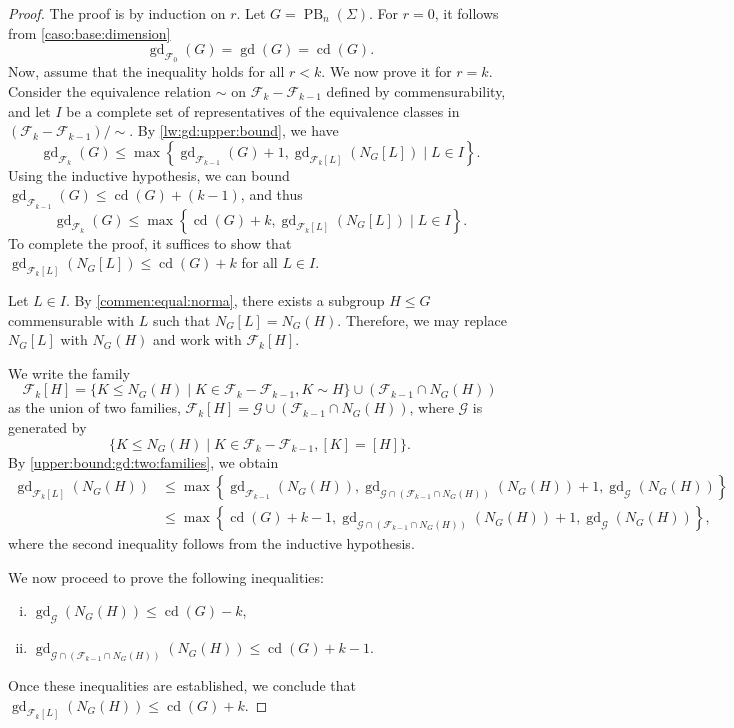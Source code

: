 \documentclass[a4paper,12pt,leqno]{amsart}
\theoremstyle{definition}
\newcommand{\calF}{{\mathcal F}}
\newcommand{\calG}{{\mathcal G}}
\DeclareMathOperator{\cd}{cd}
\DeclareMathOperator{\gd}{gd}
\DeclareMathOperator{\pb}{PB}
\begin{document}
\begin{proof}
The proof is by induction on \( r \). Let \( G = \pb_n(\Sigma) \). For \( r = 0 \), it follows from \cref{caso:base:dimension}
\[
\gd_{\calF_0}(G) = \gd(G) = \cd(G).
\]
Now, assume that the inequality holds for all \( r < k \). We now prove it for \( r = k \). Consider the equivalence relation \( \sim \) on \( \calF_k - \calF_{k-1} \) defined by commensurability, and let \( I \) be a complete set of representatives of the equivalence classes in \( (\calF_k - \calF_{k-1}) / \sim \). By \cref{lw:gd:upper:bound}, we have
\[
\gd_{\calF_k}(G) \leq \max \left\{ \gd_{\calF_{k-1}}(G) + 1, \gd_{\calF_k[L]}(N_G[L]) \mid L \in I \right\}.
\]
Using the inductive hypothesis, we can bound \( \gd_{\calF_{k-1}}(G) \leq \cd(G) + (k-1) \), and thus
\[
\gd_{\calF_k}(G) \leq \max \left\{ \cd(G) + k, \gd_{\calF_k[L]}(N_G[L]) \mid L \in I \right\}.
\]
To complete the proof, it suffices to show that \( \gd_{\calF_k[L]}(N_G[L]) \leq \cd(G) + k \) for all \( L \in I \).

Let \( L \in I \). By \cref{commen:equal:norma}, there exists a subgroup \( H \leq G \) commensurable with $L$ such that \( N_G[L] = N_G(H) \). Therefore, we may replace \( N_G[L] \) with \( N_G(H) \) and work with \( \calF_k[H] \).

We write the family 
\[
\calF_k[H] = \{ K \leq N_G(H) \mid K \in \calF_k - \calF_{k-1}, K \sim H \} \cup (\calF_{k-1}\cap N_G(H))
\]
as the union of two families, \( \calF_k[H] = \calG \cup (\calF_{k-1} \cap N_G(H))\), where \( \calG \) is generated by $$\{ K \leq N_G(H) \mid K \in \calF_k - \calF_{k-1}, [K] = [H] \}. $$ By \cref{upper:bound:gd:two:families}, we obtain
\[
\begin{split}
\gd_{\calF_k[L]}(N_G(H)) & \leq \max \left\{ \gd_{\calF_{k-1}}(N_G(H)), \gd_{\calG \cap (\calF_{k-1}\cap N_G(H))}(N_G(H)) + 1, \gd_{\calG}(N_G(H)) \right\} \\
& \leq \max \left\{ \cd(G) + k - 1, \gd_{\calG \cap (\calF_{k-1}\cap N_G(H))}(N_G(H)) + 1, \gd_{\calG}(N_G(H)) \right\},
\end{split}
\]
where the second inequality follows from the inductive hypothesis.

We now proceed to prove the following inequalities:
\begin{enumerate}[i)]
    \item \( \gd_{\calG}(N_G(H)) \leq \cd(G) - k \),
    \item \( \gd_{\calG \cap (\calF_{k-1}\cap N_G(H))}(N_G(H)) \leq \cd(G) + k - 1 \).
\end{enumerate}
Once these inequalities are established, we conclude that \( \gd_{\calF_k[L]}(N_G(H)) \leq \cd(G) + k \).


\end{proof}
\end{document}
